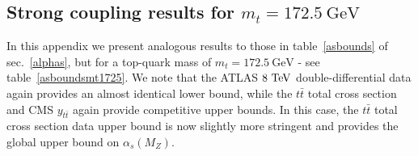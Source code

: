 \documentclass[sn-mathphys]{sn-jnl}%
\newcommand{\ytt}{y_{t\bar{t}}}
\newcommand{\mt}{m_t}
\newcommand{\ttbar}{t\bar{t}}
\newcommand{\as}{\alpha_s(M_Z)}
\newcommand{\gev}{\mathrm{GeV}}
\begin{document}
\begin{appendices}


\section{Strong coupling results for $\mt=172.5~\gev$} \label{appastable}

In this appendix we present analogous results to those in table~\ref{asbounds} of sec.~\ref{alphas}, but for a top-quark mass of $\mt = 172.5~\mathrm{GeV}$ - see table~\ref{asboundsmt1725}. We note that the ATLAS $8~\rm{TeV}$ double-differential data again provides an almost identical lower bound, while the $\ttbar$ total cross section and CMS $\ytt$ again provide competitive upper bounds. In this case, the $\ttbar$ total cross section data upper bound is now slightly more stringent and provides the global upper bound on $\as$.


\end{appendices}
\end{document}
